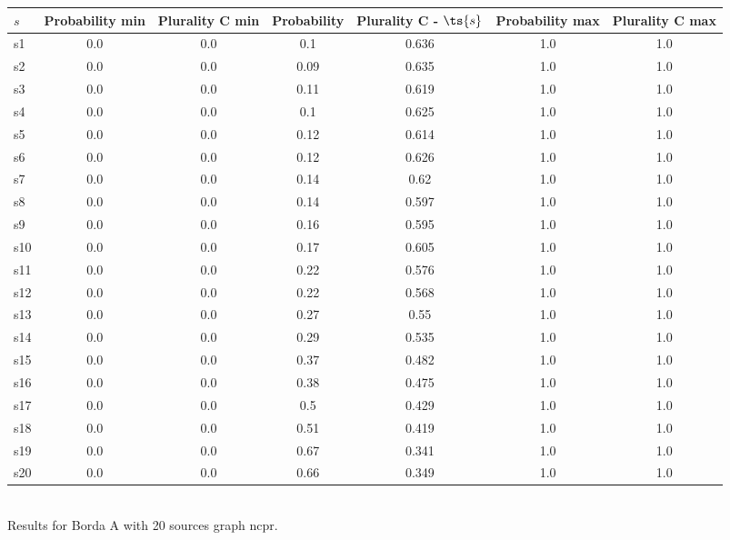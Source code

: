 \documentclass{article}
\begin{document}
\noindent\begin{tabular}{|l|c|c|c|c|c|c|}
\hline
$s$& Probability min & Plurality C min & Probability & Plurality C - $\ts{s}$ & Probability max & Plurality C max\\
\hline
s1 &0.0 & 0.0 & 0.1 & 0.636 & 1.0 & 1.0\\
\hline
s2 &0.0 & 0.0 & 0.09 & 0.635 & 1.0 & 1.0\\
\hline
s3 &0.0 & 0.0 & 0.11 & 0.619 & 1.0 & 1.0\\
\hline
s4 &0.0 & 0.0 & 0.1 & 0.625 & 1.0 & 1.0\\
\hline
s5 &0.0 & 0.0 & 0.12 & 0.614 & 1.0 & 1.0\\
\hline
s6 &0.0 & 0.0 & 0.12 & 0.626 & 1.0 & 1.0\\
\hline
s7 &0.0 & 0.0 & 0.14 & 0.62 & 1.0 & 1.0\\
\hline
s8 &0.0 & 0.0 & 0.14 & 0.597 & 1.0 & 1.0\\
\hline
s9 &0.0 & 0.0 & 0.16 & 0.595 & 1.0 & 1.0\\
\hline
s10 &0.0 & 0.0 & 0.17 & 0.605 & 1.0 & 1.0\\
\hline
s11 &0.0 & 0.0 & 0.22 & 0.576 & 1.0 & 1.0\\
\hline
s12 &0.0 & 0.0 & 0.22 & 0.568 & 1.0 & 1.0\\
\hline
s13 &0.0 & 0.0 & 0.27 & 0.55 & 1.0 & 1.0\\
\hline
s14 &0.0 & 0.0 & 0.29 & 0.535 & 1.0 & 1.0\\
\hline
s15 &0.0 & 0.0 & 0.37 & 0.482 & 1.0 & 1.0\\
\hline
s16 &0.0 & 0.0 & 0.38 & 0.475 & 1.0 & 1.0\\
\hline
s17 &0.0 & 0.0 & 0.5 & 0.429 & 1.0 & 1.0\\
\hline
s18 &0.0 & 0.0 & 0.51 & 0.419 & 1.0 & 1.0\\
\hline
s19 &0.0 & 0.0 & 0.67 & 0.341 & 1.0 & 1.0\\
\hline
s20 &0.0 & 0.0 & 0.66 & 0.349 & 1.0 & 1.0\\
\hline
\end{tabular}\\

\noindent Results for Borda A with 20 sources graph ncpr.
\end{document}
